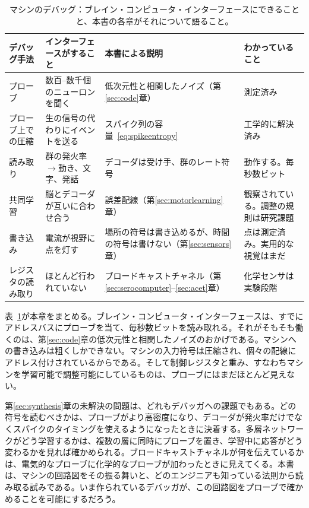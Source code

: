 \begin{table}[t]
\centering
\footnotesize
\setlength{\tabcolsep}{4pt}
\renewcommand{\arraystretch}{1.15}
\begin{tabular}{>{\raggedright}p{2.2cm}>{\raggedright}p{3.6cm}>{\raggedright}p{3.4cm}>{\raggedright\arraybackslash}p{4.0cm}}
\toprule
デバッグ手法 & インターフェースがすること & 本書による説明 & わかっていること \\
\midrule
プローブ & 数百--数千個のニューロンを聞く & 低次元性と相関したノイズ（第\ref{sec:code}章） & 測定済み \\
プローブ上での圧縮 & 生の信号の代わりにイベントを送る & スパイク列の容量~\eqref{eq:spikeentropy} & 工学的に解決済み \\
読み取り & 群の発火率$\to$動き、文字、発話 & デコーダは受け手、群のレート符号 & 動作する。毎秒数ビット \\
共同学習 & 脳とデコーダが互いに合わせ合う & 誤差配線（第\ref{sec:motorlearning}章） & 観察されている。調整の規則は研究課題 \\
書き込み & 電流が視野に点を灯す & 場所の符号は書き込めるが、時間の符号は書けない（第\ref{sec:sensors}章） & 点は測定済み。実用的な視覚はまだ \\
レジスタの読み取り & ほとんど行われていない & ブロードキャストチャネル（第\ref{sec:serocomputer}--\ref{sec:acet}章） & 化学センサは実験段階 \\
\bottomrule
\end{tabular}
\caption{マシンのデバッグ：ブレイン・コンピュータ・インターフェースにできることと、本書の各章がそれについて語ること。}
\label{tab:debugging}
\end{table}

表~\ref{tab:debugging}が本章をまとめる。ブレイン・コンピュータ・インターフェースは、すでにアドレスバスにプローブを当て、毎秒数ビットを読み取れる。それがそもそも働くのは、第\ref{sec:code}章の低次元性と相関したノイズのおかげである。マシンへの書き込みは粗くしかできない。マシンの入力符号は圧縮され、個々の配線にアドレス付けされているからである。そして制御レジスタと重み、すなわちマシンを学習可能で調整可能にしているものは、プローブにはまだほとんど見えない。

第\ref{sec:synthesis}章の未解決の問題は、どれもデバッガへの課題でもある。どの符号を読むべきかは、プローブがより高密度になり、デコーダが発火率だけでなくスパイクのタイミングを使えるようになったときに決着する。多層ネットワークがどう学習するかは、複数の層に同時にプローブを置き、学習中に応答がどう変わるかを見れば確かめられる。ブロードキャストチャネルが何を伝えているかは、電気的なプローブに化学的なプローブが加わったときに見えてくる。本書は、マシンの回路図をその振る舞いと、どのエンジニアも知っている法則から読み取る試みである。いま作られているデバッガが、この回路図をプローブで確かめることを可能にするだろう。

